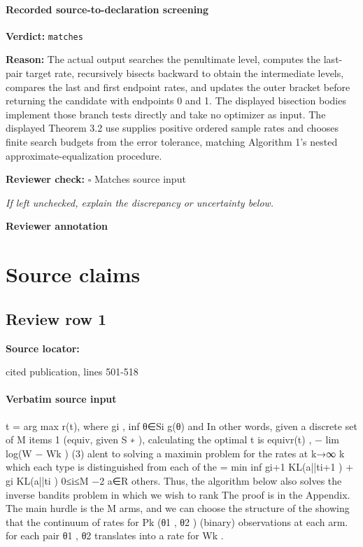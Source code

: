 \documentclass[10pt]{article}
\newcommand{\reviewerbox}{%
  \par\noindent\fbox{\parbox{0.96\linewidth}{\rule{0pt}{0.38in}}}\par
}
\newcommand{\reviewmatch}[1]{%
  \par\noindent\textbf{Reviewer check:} $\square$\; #1\par
  \noindent\emph{If left unchecked, explain the discrepancy or uncertainty below.}\par
}
\begin{document}
\paragraph{Recorded source-to-declaration screening}
\textbf{Verdict:} \texttt{matches}
\\
{\raggedright
\textbf{Reason:} The actual output searches the penultimate level, computes the last-\allowbreak{}pair target rate, recursively bisects backward to obtain the intermediate levels, compares the last and first endpoint rates, and updates the outer bracket before returning the candidate with endpoints 0 and 1.\allowbreak{} The displayed bisection bodies implement those branch tests directly and take no optimizer as input.\allowbreak{} The displayed Theorem 3.\allowbreak{}2 use supplies positive ordered sample rates and chooses finite search budgets from the error tolerance, matching Algorithm 1's nested approximate-\allowbreak{}equalization procedure.\allowbreak{}
\par}
\reviewmatch{Matches source input}
\noindent\textbf{Reviewer annotation}\par
\reviewerbox

\clearpage
\hypertarget{source-claim-8a7eb113492e3a82}{}
\hypertarget{source-section-f10b5f68e4acf3dc}{}
\section*{Source claims}
\subsection*{Review row 1}
\textbf{Source locator:} {\footnotesize\raggedright cited publication, lines 501-\allowbreak{}518\par}
\paragraph{Verbatim source input}
\begin{ReviewVerbatim}
t = arg max r(t), where gi , inf θ∈Si g(θ) and
In other words, given a discrete set of M items
1
(equiv, given S ∗ ), calculating the optimal t is equivr(t) , − lim log(W − Wk )
(3)
alent to solving a maximin problem for the rates at
k→∞ k
which
each type is distinguished from each of the
= min inf {gi+1 KL(a||ti+1 ) + gi KL(a||ti )}
0≤i≤M −2 a∈R
others. Thus, the algorithm below also solves the
inverse bandits problem in which we wish to rank
The proof is in the Appendix. The main hurdle is
the M arms, and we can choose the structure of the
showing that the continuum of rates for Pk (θ1 , θ2 )
(binary) observations at each arm.
for each pair θ1 , θ2 translates into a rate for Wk .
\end{ReviewVerbatim}
\end{document}
